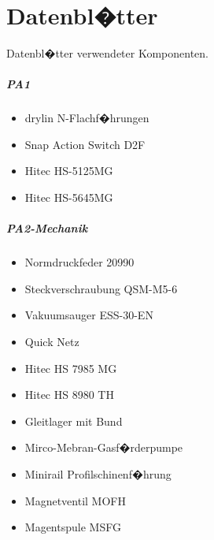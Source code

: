 %
%
\chapter{Datenbl�tter}\label{ch:datenblaetter_bestellliste}
	Datenbl�tter verwendeter Komponenten.
	\paragraph{PA1}
	\begin{itemize}[parsep=1pt]
		\item drylin N-Flachf�hrungen
		\item Snap Action Switch D2F
		\item Hitec HS-5125MG
		\item Hitec HS-5645MG
	\end{itemize}
	\paragraph{PA2-Mechanik}
	\begin{itemize}[parsep=1pt]
		\item Normdruckfeder 20990
		\item Steckverschraubung QSM-M5-6
		\item Vakuumsauger ESS-30-EN
		\item Quick Netz
		\item Hitec HS 7985 MG
		\item Hitec HS 8980 TH
		\item Gleitlager mit Bund
		\item Mirco-Mebran-Gasf�rderpumpe
		\item Minirail Profilschinenf�hrung
		\item Magnetventil MOFH
		\item Magentspule MSFG
	\end{itemize}
